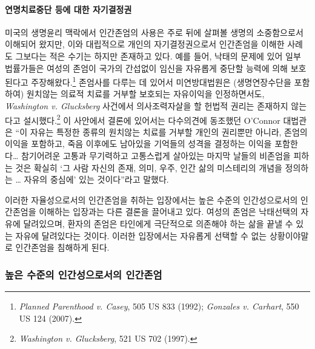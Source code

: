 \paragraph{연명치료중단 등에 대한 자기결정권}

미국의 생명윤리 맥락에서 인간존엄의 사용은 주로 뒤에 살펴볼 생명의 소중함으로서 이해되어 왔지만, 이와 대립적으로 개인의 자기결정권으로서 인간존엄을 이해한 사례도 그보다는 적은 수기는 하지만 존재하고 있다. 예를 들어, 낙태의 문제에 있어 일부 법률가들은 여성의 존엄이 국가의 간섭없이 임신을 자유롭게 중단할 능력에 의해 보호된다고 주장해왔다.\footnote{\emph{Planned Parenthood v. Casey}, 505 US 833 (1992); \emph{Gonzales v. Carhart}, 550 US 124 (2007).} 존엄사를 다루는 데 있어서 미연방대법원은 (생명연장수단을 포함하여) 원치않는 의료적 치료를 거부할 보호되는 자유이익을 인정하면서도, \emph{Washington v. Glucksberg} 사건에서 의사조력자살을 할 헌법적 권리는 존재하지 않는다고 설시했다.\footnote{\emph{Washington v. Glucksberg}, 521 US 702 (1997).} 이 사안에서 결론에 있어서는 다수의견에 동조했던 O'Connor 대법관은 ``이 자유는 특정한 종류의 원치않는 치료를 거부할 개인의 권리뿐만 아니라, 존엄의 이익을 포함하고, 죽음 이후에도 남아있을 기억들의 성격을 결정하는 이익을 포함한다\ldots{} 참기어려운 고통과 무기력하고 고통스럽게 살아있는 마지막 날들의 비존엄을 피하는 것은 확실히 `그 사람 자신의 존재, 의미, 우주, 인간 삶의 미스테리의 개념을 정의하는 \ldots{} 자유의 중심에' 있는 것이다''라고 말했다.

이러한 자율성으로서의 인간존엄을 취하는 입장에서는 높은 수준의 인간성으로서의 인간존엄을 이해하는 입장과는 다른 결론을 끌어내고 있다. 여성의 존엄은 낙태선택의 자유에 달려있으며, 환자의 존엄은 타인에게 극단적으로 의존해야 하는 삶을 끝낼 수 있는 자유에 달려있다는 것이다. 이러한 입장에서는 자유롭게 선택할 수 없는 상황이야말로 인간존엄을 침해하게 된다.

\subsubsection{높은 수준의 인간성으로서의 인간존엄}

